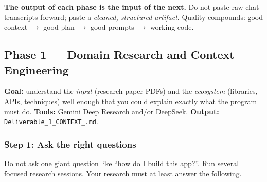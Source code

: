 \documentclass[11pt,a4paper]{article}
\newcommand{\uid}{[HeUserID]}
\newcommand{\dA}{\texttt{Deliverable\_1\_\allowbreak CONTEXT\_\allowbreak\uid.md}}
\begin{document}
\begin{tipbox}
\textbf{The output of each phase is the input of the next.} Do not paste raw chat transcripts forward; paste a \emph{cleaned, structured artifact}. Quality compounds: good context $\rightarrow$ good plan $\rightarrow$ good prompts $\rightarrow$ working code.
\end{tipbox}

\subsection{Phase 1 --- Domain Research and Context Engineering}
\label{sec:phase1}
\textbf{Goal:} understand the \emph{input} (research-paper PDFs) and the \emph{ecosystem} (libraries, APIs, techniques) well enough that you could explain exactly what the program must do. \textbf{Tools:} Gemini Deep Research and/or DeepSeek. \textbf{Output:} \dA.

\subsubsection{Step 1: Ask the right questions}
Do not ask one giant question like ``how do I build this app?''. Run several focused research sessions. Your research must at least answer the following.
\end{document}
